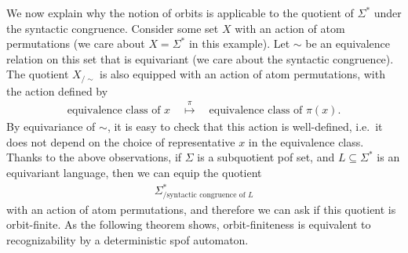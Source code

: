 We now explain why the notion of orbits is applicable to the quotient of $\Sigma^*$ under the syntactic congruence.  
Consider some set $X$ with an action of atom permutations (we care about $X = \Sigma^*$ in this example). Let $\sim$ be an equivalence relation on this set that is equivariant (we care about the syntactic congruence). The quotient $
X_{/\sim}$
is also equipped with an action of atom permutations, with the action defined by 
\begin{align}\label{eq:action-on-equivalence-classes}
\text{equivalence class of $x$}
\quad \stackrel \pi \mapsto \quad 
\text{equivalence class of $\pi(x)$}.
\end{align}
By equivariance of $\sim$, it is easy to check that this action is well-defined, i.e.~it does not depend on the choice of representative $x$ in the equivalence class.
Thanks to the above observations, if $\Sigma$ is a subquotient pof set, and $L \subseteq \Sigma^*$ is an equivariant language, then we can equip the quotient 
\begin{align*}
\Sigma^*_{/ \text{syntactic congruence of $L$}}
\end{align*}
with an action of atom permutations, and therefore we can ask if this quotient is orbit-finite. As the following theorem shows, orbit-finiteness is equivalent to recognizability by a deterministic spof automaton.

